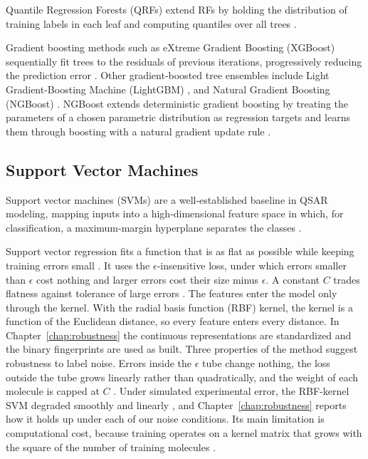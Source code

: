 Quantile Regression Forests (QRFs) extend RFs by holding the distribution of training labels in each leaf and computing quantiles over all trees \citep{Meinshausen2006}.

Gradient boosting methods such as eXtreme Gradient Boosting (XGBoost) sequentially fit trees to the residuals of previous iterations, progressively reducing the prediction error \citep{Chen2016, Mustapha2016, Tian2022}. Other gradient-boosted tree ensembles include Light Gradient-Boosting Machine (LightGBM) \citep{ke2017lightgbm}, and Natural Gradient Boosting (NGBoost) \citep{Duan2020}. NGBoost extends deterministic gradient boosting by treating the parameters of a chosen parametric distribution as regression targets and learns them through boosting with a natural gradient update rule \citep{Duan2020}.


\subsection{Support Vector Machines}

Support vector machines (SVMs) are a well-established baseline in QSAR modeling, mapping inputs into a high-dimensional feature space in which, for classification, a maximum-margin hyperplane separates the classes \citep{Vapnik1995, Svetnik2003}.

Support vector regression fits a function that is as flat as possible while keeping training errors small \citep{Vapnik1995, Smola2004}. It uses the $\epsilon$-insensitive loss, under which errors smaller than $\epsilon$ cost nothing and larger errors cost their size minus $\epsilon$. A constant $C$ trades flatness against tolerance of large errors \citep{Cortes1995}. The features enter the model only through the kernel. With the radial basis function (RBF) kernel, the kernel is a function of the Euclidean distance, so every feature enters every distance. In Chapter~\ref{chap:robustness} the continuous representations are standardized and the binary fingerprints are used as built. Three properties of the method suggest robustness to label noise. Errors inside the $\epsilon$ tube change nothing, the loss outside the tube grows linearly rather than quadratically, and the weight of each molecule is capped at $C$ \citep{Smola2004}. Under simulated experimental error, the RBF-kernel SVM degraded smoothly and linearly \citep{Cortes2015}, and Chapter~\ref{chap:robustness} reports how it holds up under each of our noise conditions. Its main limitation is computational cost, because training operates on a kernel matrix that grows with the square of the number of training molecules \citep{Chang2011}.



